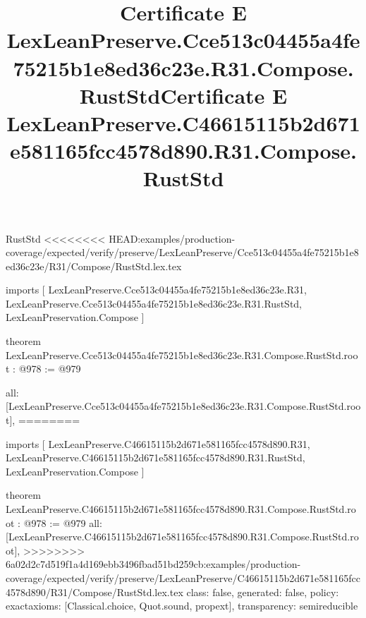 \begin{lexlean}{RustStd}
<<<<<<<< HEAD:examples/production-coverage/expected/verify/preserve/LexLeanPreserve/Cce513c04455a4fe75215b1e8ed36c23e/R31/Compose/RustStd.lex.tex
\title{Certificate E LexLeanPreserve.Cce513c04455a4fe75215b1e8ed36c23e.R31.Compose.RustStd}
\begin{coremodule}
imports [
  LexLeanPreserve.Cce513c04455a4fe75215b1e8ed36c23e.R31,
  LexLeanPreserve.Cce513c04455a4fe75215b1e8ed36c23e.R31.RustStd,
  LexLeanPreservation.Compose
]

theorem LexLeanPreserve.Cce513c04455a4fe75215b1e8ed36c23e.R31.Compose.RustStd.root : @978 := @979 {
  all: [LexLeanPreserve.Cce513c04455a4fe75215b1e8ed36c23e.R31.Compose.RustStd.root],
========
\title{Certificate E LexLeanPreserve.C46615115b2d671e581165fcc4578d890.R31.Compose.RustStd}
\begin{coremodule}
imports [
  LexLeanPreserve.C46615115b2d671e581165fcc4578d890.R31,
  LexLeanPreserve.C46615115b2d671e581165fcc4578d890.R31.RustStd,
  LexLeanPreservation.Compose
]

theorem LexLeanPreserve.C46615115b2d671e581165fcc4578d890.R31.Compose.RustStd.root : @978 := @979 {
  all: [LexLeanPreserve.C46615115b2d671e581165fcc4578d890.R31.Compose.RustStd.root],
>>>>>>>> 6a02d2c7d519f1a4d169ebb3496fbad51bd259cb:examples/production-coverage/expected/verify/preserve/LexLeanPreserve/C46615115b2d671e581165fcc4578d890/R31/Compose/RustStd.lex.tex
  class: false,
  generated: false,
  policy: exact{axioms: [Classical.choice, Quot.sound, propext]},
  transparency: semireducible
}


\end{coremodule}}
\end{coremodule}
\end{lexlean}
